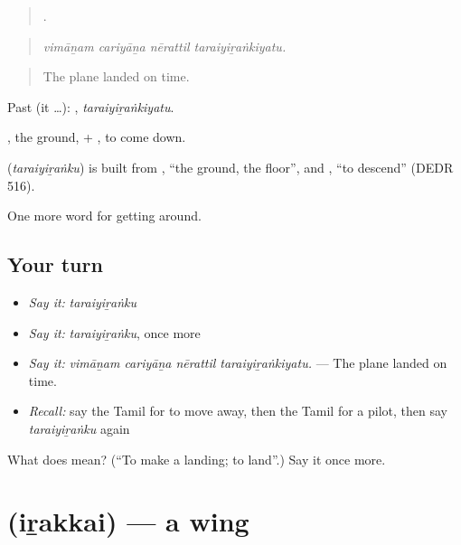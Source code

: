\begin{quote}
   .
\end{quote}

\begin{quote}
\emph{vimāṉam cariyāṉa nērattil taraiyiṟaṅkiyatu.}
\end{quote}

\begin{quote}
The plane landed on time.
\end{quote}

Past (it …): , \emph{taraiyiṟaṅkiyatu}.

, the ground, + , to come down.

\begin{cousinweb}
\textbf{} (\emph{taraiyiṟaṅku}) is built from , \textquotedblleft{}the ground, the floor\textquotedblright{}, and , \textquotedblleft{}to descend\textquotedblright{} (DEDR 516).
\end{cousinweb}

\begin{grammarlens}[title={What you've built}]
One more word for getting around.
\end{grammarlens}

\subsection*{Your turn}
\begin{itemize}
\raggedright
  \item \emph{Say it:} \emph{taraiyiṟaṅku}
  \item \emph{Say it:} \emph{taraiyiṟaṅku}, once more
  \item \emph{Say it:} \emph{vimāṉam cariyāṉa nērattil taraiyiṟaṅkiyatu.} — The plane landed on time.
  \item \emph{Recall:} say the Tamil for to move away, then the Tamil for a pilot, then say \emph{taraiyiṟaṅku} again
\end{itemize}

\begin{tcolorbox}[breakable,colback=teal!4,colframe=teal!35!black,title={Before you move on}]
What does  mean? (\textquotedblleft{}To make a landing; to land\textquotedblright{}.) Say it once more.
\end{tcolorbox}
\section[\texorpdfstring{\ta{இறக்கை} (iṟakkai)}{இறக்கை (iṟakkai)}]{ (iṟakkai) — a wing}

